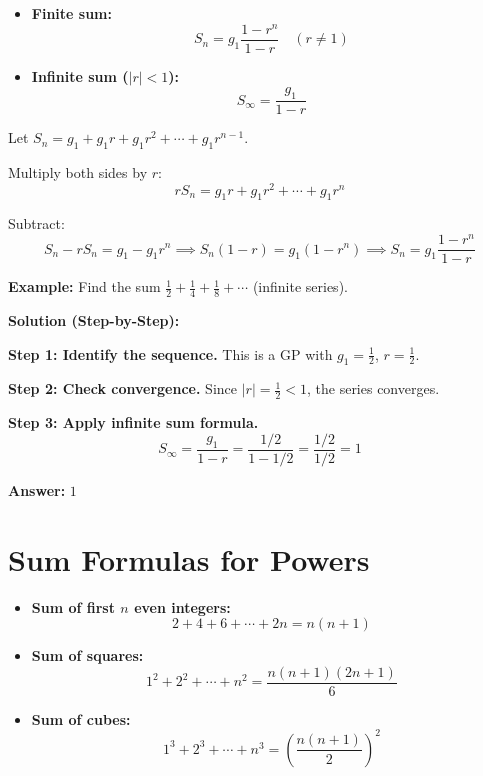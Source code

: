 \documentclass[12pt]{extarticle}
\begin{document}
\begin{itemize}
\item \textbf{Finite sum:}
\[
S_n = g_1 \frac{1 - r^n}{1 - r} \quad (r \neq 1)
\]

\item \textbf{Infinite sum ($|r| < 1$):}
\[
S_\infty = \frac{g_1}{1 - r}
\]
\end{itemize}

\begin{conceptbox}
Let $S_n = g_1 + g_1r + g_1r^2 + \cdots + g_1r^{n-1}$.

Multiply both sides by $r$:
\[
rS_n = g_1r + g_1r^2 + \cdots + g_1r^n
\]

Subtract:
\[
S_n - rS_n = g_1 - g_1r^n \implies S_n(1-r) = g_1(1-r^n) \implies S_n = g_1\frac{1-r^n}{1-r}
\]
\end{conceptbox}

\begin{examplebox}
\textbf{Example:} Find the sum $\frac{1}{2} + \frac{1}{4} + \frac{1}{8} + \cdots$ (infinite series).

\textbf{Solution (Step-by-Step):}

\textbf{Step 1: Identify the sequence.} This is a GP with $g_1 = \frac{1}{2}$, $r = \frac{1}{2}$.

\textbf{Step 2: Check convergence.} Since $|r| = \frac{1}{2} < 1$, the series converges.

\textbf{Step 3: Apply infinite sum formula.}
\[
S_\infty = \frac{g_1}{1-r} = \frac{1/2}{1-1/2} = \frac{1/2}{1/2} = 1
\]

\textbf{Answer:} $\boxed{1}$
\end{examplebox}

\section{Sum Formulas for Powers}

\begin{itemize}
\item \textbf{Sum of first $n$ even integers:}
\[
2+4+6+\cdots+2n = n(n+1)
\]

\item \textbf{Sum of squares:}
\[
1^2+2^2+\cdots+n^2 = \frac{n(n+1)(2n+1)}{6}
\]

\item \textbf{Sum of cubes:}
\[
1^3+2^3+\cdots+n^3 = \left(\frac{n(n+1)}{2}\right)^2
\]
\end{itemize}
\end{document}
